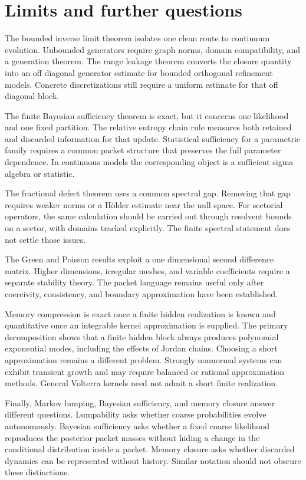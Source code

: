 \documentclass{aomart}
\theoremstyle{definition}
\theoremstyle{remark}
\begin{document}
\section{Limits and further questions}\label{sec:limits}

The bounded inverse limit theorem isolates one clean route to continuum evolution. Unbounded generators require graph norms, domain compatibility, and a generation theorem. The range leakage theorem converts the closure quantity into an off diagonal generator estimate for bounded orthogonal refinement models. Concrete discretizations still require a uniform estimate for that off diagonal block.

The finite Bayesian sufficiency theorem is exact, but it concerns one likelihood and one fixed partition. The relative entropy chain rule measures both retained and discarded information for that update. Statistical sufficiency for a parametric family requires a common packet structure that preserves the full parameter dependence. In continuous models the corresponding object is a sufficient sigma algebra or statistic.

The fractional defect theorem uses a common spectral gap. Removing that gap requires weaker norms or a Hölder estimate near the null space. For sectorial operators, the same calculation should be carried out through resolvent bounds on a sector, with domains tracked explicitly. The finite spectral statement does not settle those issues.

The Green and Poisson results exploit a one dimensional second difference matrix. Higher dimensions, irregular meshes, and variable coefficients require a separate stability theory. The packet language remains useful only after coercivity, consistency, and boundary approximation have been established.

Memory compression is exact once a finite hidden realization is known and quantitative once an integrable kernel approximation is supplied. The primary decomposition shows that a finite hidden block always produces polynomial exponential modes, including the effects of Jordan chains. Choosing a short approximation remains a different problem. Strongly nonnormal systems can exhibit transient growth and may require balanced or rational approximation methods. General Volterra kernels need not admit a short finite realization.

Finally, Markov lumping, Bayesian sufficiency, and memory closure answer different questions. Lumpability asks whether coarse probabilities evolve autonomously. Bayesian sufficiency asks whether a fixed coarse likelihood reproduces the posterior packet masses without hiding a change in the conditional distribution inside a packet. Memory closure asks whether discarded dynamics can be represented without history. Similar notation should not obscure these distinctions.
\end{document}
